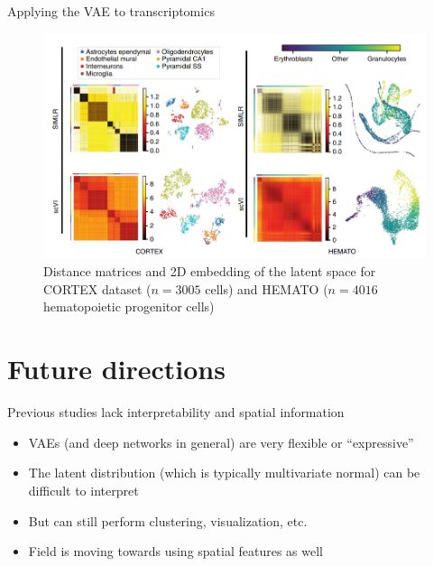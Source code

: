 \documentclass{beamer}					%
\begin{document}
\begin{frame}{Applying the VAE to transcriptomics}

\begin{figure}
\begin{center}
\includegraphics[width=1.0\textwidth]{force}
\end{center}
\caption{Distance matrices and 2D embedding of the latent space for CORTEX dataset ($n=3005$ cells) and HEMATO ($n=4016$ hematopoietic progenitor cells)}
\end{figure}

\end{frame}

\section{Future directions}

\begin{frame}{Previous studies lack interpretability and spatial information}

\begin{itemize}
\item VAEs (and deep networks in general) are very flexible or ``expressive''
\item The latent distribution (which is typically multivariate normal) can be difficult to interpret
\item But can still perform clustering, visualization, etc.
\item Field is moving towards using spatial features as well
\end{itemize}



\end{frame}
\end{document}

